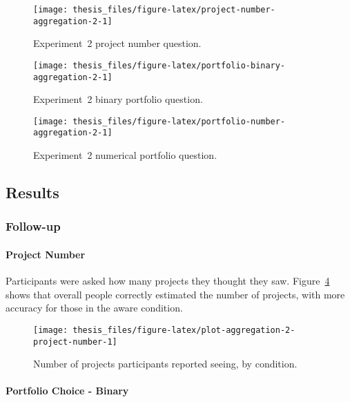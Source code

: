 \documentclass[a4paper, nobind]{templates/ociamthesis}
\theoremstyle{definition}
\theoremstyle{definition}
\theoremstyle{definition}
\theoremstyle{definition}
\theoremstyle{remark}
\begin{document}
\begin{figure}
\texttt{[image: thesis\_files/figure-latex/project-number-aggregation-2-1]} \caption{Experiment~2 project number question.}\label{fig:project-number-aggregation-2}
\end{figure}



\begin{figure}
\texttt{[image: thesis\_files/figure-latex/portfolio-binary-aggregation-2-1]} \caption{Experiment~2 binary portfolio question.}\label{fig:portfolio-binary-aggregation-2}
\end{figure}



\begin{figure}
\texttt{[image: thesis\_files/figure-latex/portfolio-number-aggregation-2-1]} \caption{Experiment~2 numerical portfolio question.}\label{fig:portfolio-number-aggregation-2}
\end{figure}

\hypertarget{results-aggregation-2-appendix}{%
\subsection{Results}\label{results-aggregation-2-appendix}}

\subsubsection{Follow-up}

\paragraph{Project Number}

Participants were asked how many projects they thought they saw.
Figure~\ref{fig:plot-aggregation-2-project-number} shows that overall people
correctly estimated the number of projects, with more accuracy for those in the
aware condition.



\begin{figure}
\texttt{[image: thesis\_files/figure-latex/plot-aggregation-2-project-number-1]} \caption{Number of projects participants reported seeing, by condition.}\label{fig:plot-aggregation-2-project-number}
\end{figure}

\paragraph{Portfolio Choice - Binary}
\end{document}
